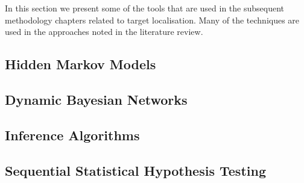

In this section we present some of the tools that are used in the subsequent methodology chapters related to target localisation. Many of the techniques are used in the approaches noted in the literature review.


\subsection{Hidden Markov Models}\label{subsec:BGHMM}


\subsection{Dynamic Bayesian Networks}\label{subsec:BGDBN}


\subsection{Inference Algorithms}\label{subsec:BGInfAlgos}


%

\subsection{Sequential Statistical Hypothesis Testing}\label{subsec:SPRT}


%